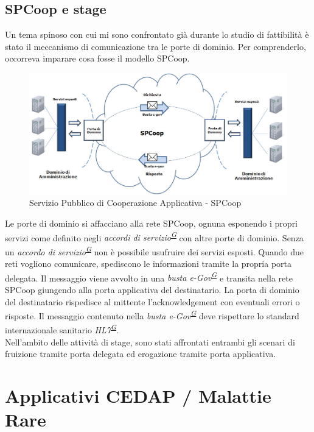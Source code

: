 \documentclass[a4paper]{article}
\begin{document}
\subsection{SPCoop e stage}
Un tema spinoso con cui mi sono confrontato già durante lo studio di fattibilità è stato il meccanismo di comunicazione tra le porte di dominio. Per comprenderlo, occorreva imparare cosa fosse il modello SPCoop.
\begin{figure}[H]
	\centering
	\includegraphics[width=0.4\linewidth]{images/SPCoop.jpg}
    \caption{Servizio Pubblico di Cooperazione Applicativa - SPCoop}
\end{figure}
Le porte di dominio si affacciano alla rete SPCoop, ognuna esponendo i propri servizi come definito negli \textit{accordi di servizio\textsuperscript{\hyperref[sec:gl]{G}}} con altre porte di dominio. Senza un \textit{accordo di servizio\textsuperscript{\hyperref[sec:gl]{G}}} non è possibile usufruire dei servizi esposti. Quando due reti vogliono comunicare, spediscono le informazioni tramite la propria porta delegata. Il messaggio viene avvolto in una \textit{busta e-Gov\textsuperscript{\hyperref[sec:gl]{G}}} e transita nella rete SPCoop giungendo alla porta applicativa del destinatario. La porta di dominio del destinatario rispedisce al mittente l'acknowledgement con eventuali errori o risposte. Il messaggio contenuto nella \textit{busta e-Gov\textsuperscript{\hyperref[sec:gl]{G}}} deve rispettare lo standard internazionale sanitario \textit{HL7\textsuperscript{\hyperref[sec:gl]{G}}}.
\\
Nell'ambito delle attività di stage, sono stati affrontati entrambi gli scenari di fruizione tramite porta delegata ed erogazione tramite porta applicativa.

\newpage

\section{Applicativi CEDAP / Malattie Rare}
\end{document}
